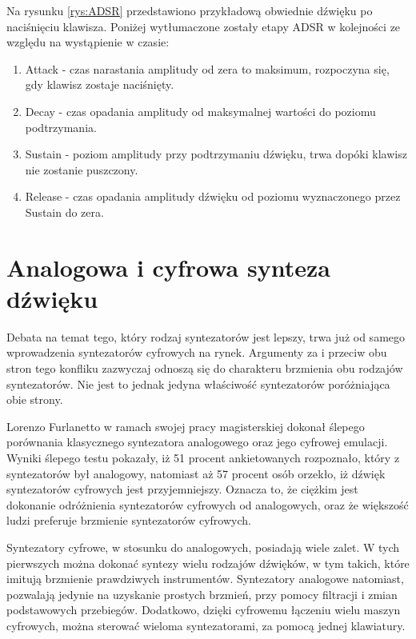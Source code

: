 Na rysunku \ref{rys:ADSR} przedstawiono przykładową obwiednie dźwięku po naciśnięciu klawisza. Poniżej wytłumaczone zostały etapy ADSR w kolejności ze względu na wystąpienie w czasie:
\begin{enumerate}
	\item Attack - czas narastania amplitudy od zera to maksimum, rozpoczyna się, gdy klawisz zostaje naciśnięty.
	
	\item Decay - czas opadania amplitudy od maksymalnej wartości do poziomu podtrzymania.
	
	\item Sustain - poziom amplitudy przy podtrzymaniu dźwięku, trwa dopóki klawisz nie zostanie puszczony.
	
	\item Release - czas opadania amplitudy dźwięku od poziomu wyznaczonego przez Sustain do zera.
\end{enumerate}


\section{Analogowa i cyfrowa synteza dźwięku}
Debata na temat tego, który rodzaj syntezatorów jest lepszy, trwa już od samego wprowadzenia syntezatorów cyfrowych na rynek. Argumenty za i przeciw obu stron tego konfliku zazwyczaj odnoszą się do charakteru brzmienia obu rodzajów syntezatorów. Nie jest to jednak jedyna właściwość syntezatorów poróżniająca obie strony.

Lorenzo Furlanetto w ramach swojej pracy magisterskiej dokonał ślepego porównania klasycznego syntezatora analogowego oraz jego cyfrowej emulacji. Wyniki ślepego testu pokazały, iż 51 procent ankietowanych rozpoznało, który z syntezatorów był analogowy, natomiast aż 57 procent osób orzekło, iż dźwięk syntezatorów cyfrowych jest przyjemniejszy. Oznacza to, że ciężkim jest dokonanie odróżnienia syntezatorów cyfrowych od analogowych, oraz że większość ludzi preferuje brzmienie syntezatorów cyfrowych.

Syntezatory cyfrowe, w stosunku do analogowych, posiadają wiele zalet. W tych pierwszych można dokonać syntezy wielu rodzajów dźwięków, w tym takich, które imitują brzmienie prawdziwych instrumentów. Syntezatory analogowe natomiast, pozwalają jedynie na uzyskanie prostych brzmień, przy pomocy filtracji i zmian podstawowych przebiegów. Dodatkowo, dzięki cyfrowemu łączeniu wielu maszyn cyfrowych, można sterować wieloma syntezatorami, za pomocą jednej klawiatury.

